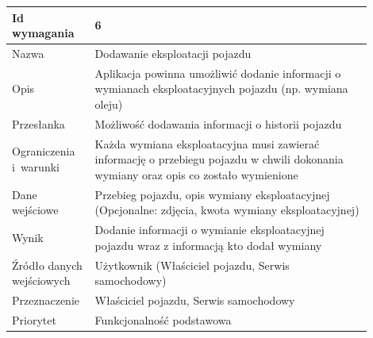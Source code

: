 \documentclass[12pt]{article}
\begin{document}
\begin{table}[H]
\begin{center}
	\begin{tabular}{|p{0.18\linewidth}|p{0.72\linewidth}|}%
	\hline
	Id wymagania 	& 6 				\\ \hline
	Nazwa			& Dodawanie eksploatacji pojazdu \\ \hline
	Opis &	 Aplikacja powinna umożliwić dodanie informacji o wymianach eksploatacyjnych pojazdu (np. wymiana oleju)\\ \hline
	Przesłanka & Możliwość dodawania informacji o historii pojazdu  \\ \hline
	Ograniczenia i~warunki & Każda wymiana eksploatacyjna musi zawierać informację o przebiegu pojazdu w chwili dokonania wymiany oraz opis co zostało wymienione \\ \hline
	Dane wejściowe &Przebieg pojazdu, opis wymiany eksploatacyjnej
(Opcjonalne: zdjęcia, kwota wymiany eksploatacyjnej) \\ \hline
	Wynik & Dodanie informacji o wymianie eksploatacyjnej pojazdu wraz z informacją kto dodał wymiany\\ \hline
	Źródło danych wejściowych &Użytkownik (Właściciel pojazdu, Serwis samochodowy)\\ \hline	Przeznaczenie & Właściciel pojazdu, Serwis samochodowy\\ \hline
	Priorytet & Funkcjonalność podstawowa \\ \hline
	\end{tabular}
\end{center}
\end{table}
\end{document}
